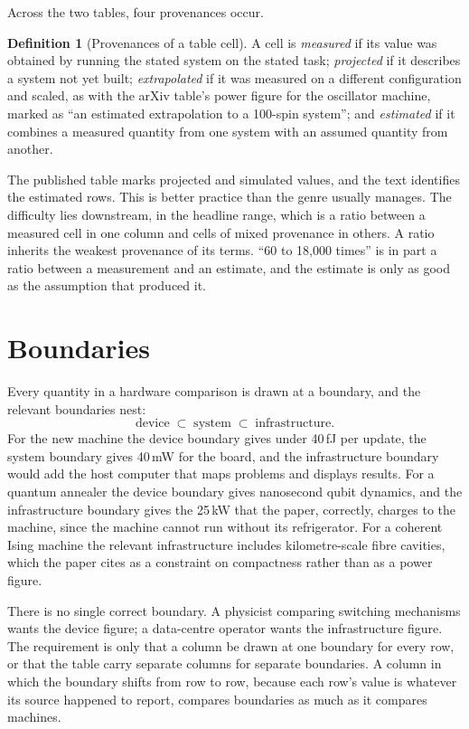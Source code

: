 \documentclass[11pt]{article}
\theoremstyle{definition}
\newtheorem{definition}{Definition}
\theoremstyle{remark}
\begin{document}
Across the two tables, four provenances occur.

\begin{definition}[Provenances of a table cell]
A cell is \emph{measured} if its value was obtained by running the stated system on the stated task; \emph{projected} if it describes a system not yet built; \emph{extrapolated} if it was measured on a different configuration and scaled, as with the arXiv table's power figure for the oscillator machine, marked as ``an estimated extrapolation to a 100-spin system''; and \emph{estimated} if it combines a measured quantity from one system with an assumed quantity from another.
\end{definition}

The published table marks projected and simulated values, and the text identifies the estimated rows. This is better practice than the genre usually manages. The difficulty lies downstream, in the headline range, which is a ratio between a measured cell in one column and cells of mixed provenance in others. A ratio inherits the weakest provenance of its terms. ``60 to 18,000 times'' is in part a ratio between a measurement and an estimate, and the estimate is only as good as the assumption that produced it.

\section{Boundaries}

Every quantity in a hardware comparison is drawn at a boundary, and the relevant boundaries nest:
\begin{equation}
\text{device} \;\subset\; \text{system} \;\subset\; \text{infrastructure}.
\end{equation}
For the new machine the device boundary gives under 40\,fJ per update, the system boundary gives 40\,mW for the board, and the infrastructure boundary would add the host computer that maps problems and displays results. For a quantum annealer the device boundary gives nanosecond qubit dynamics, and the infrastructure boundary gives the 25\,kW that the paper, correctly, charges to the machine, since the machine cannot run without its refrigerator. For a coherent Ising machine the relevant infrastructure includes kilometre-scale fibre cavities, which the paper cites as a constraint on compactness rather than as a power figure.

There is no single correct boundary. A physicist comparing switching mechanisms wants the device figure; a data-centre operator wants the infrastructure figure. The requirement is only that a column be drawn at one boundary for every row, or that the table carry separate columns for separate boundaries. A column in which the boundary shifts from row to row, because each row's value is whatever its source happened to report, compares boundaries as much as it compares machines.
\end{document}
